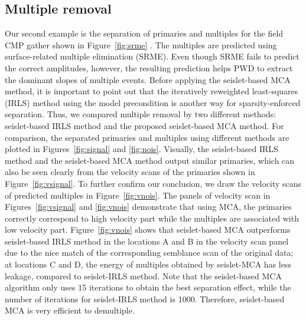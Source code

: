 
% 
  

\subsection{Multiple removal}

Our second example is the separation of primaries and multiples for the field CMP gather shown in Figure~\ref{fig:srme} \citep{fomel2006regularizing}. The multiples are predicted using surface-related multiple elimination (SRME). Even though SRME fails to predict the correct amplitudes, however, the resulting prediction helps PWD to extract the dominant slopes of multiple events. 
Before applying the seislet-based MCA method, it is important to point out that the iteratively reweighted least-squares (IRLS) method using the model precondition is another way for sparsity-enforced separation. Thus, we compared multiple removal by two different methods: seislet-based IRLS method and the proposed seislet-based MCA method. For comparison, the separated primaries and multiples using different methods are plotted in Figures~\ref{fig:signal} and \ref{fig:nois}. Visually, the seislet-based IRLS method and the seislet-based MCA method output similar primaries, which can also be seen clearly from the velocity scans of the primaries shown in Figure~\ref{fig:vsignal}. To further confirm our conclusion, we draw the velocity scans of predicted multiples in Figure~\ref{fig:vnois}. The panels of velocity scan in Figures~\ref{fig:vsignal} and \ref{fig:vnois} demonstrate that using MCA, the primaries correctly correspond to high velocity part while the multiples are associated with low velocity part. Figure~\ref{fig:vnois} shows that seislet-based MCA outperforms seislet-based IRLS method in the locations A and B in the velocity scan panel due to the nice match of the corresponding semblance scan of the original data; at locations C and D, the energy of multiples obtained by seislet-MCA has less leakage, compared to seislet-IRLS method. Note that the seislet-based MCA algorithm only uses 15 iterations to obtain the best separation effect, while the number of iterations for seislet-IRLS method is 1000. Therefore, seislet-based MCA is very efficient to demultiple.


